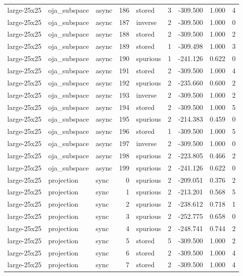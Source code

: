 \begin{tabular}{lllrlrrrr}
large-25x25 & oja\_subspace & async & 186 & stored & 3 & -309.500 & 1.000 & 4 \\
large-25x25 & oja\_subspace & async & 187 & inverse & 2 & -309.500 & 1.000 & 0 \\
large-25x25 & oja\_subspace & async & 188 & stored & 2 & -309.500 & 1.000 & 2 \\
large-25x25 & oja\_subspace & async & 189 & stored & 1 & -309.498 & 1.000 & 3 \\
large-25x25 & oja\_subspace & async & 190 & spurious & 1 & -241.126 & 0.622 & 0 \\
large-25x25 & oja\_subspace & async & 191 & stored & 2 & -309.500 & 1.000 & 4 \\
large-25x25 & oja\_subspace & async & 192 & spurious & 2 & -235.660 & 0.600 & 2 \\
large-25x25 & oja\_subspace & async & 193 & inverse & 2 & -309.500 & 1.000 & 2 \\
large-25x25 & oja\_subspace & async & 194 & stored & 2 & -309.500 & 1.000 & 5 \\
large-25x25 & oja\_subspace & async & 195 & spurious & 2 & -214.383 & 0.459 & 0 \\
large-25x25 & oja\_subspace & async & 196 & stored & 1 & -309.500 & 1.000 & 5 \\
large-25x25 & oja\_subspace & async & 197 & inverse & 2 & -309.500 & 1.000 & 0 \\
large-25x25 & oja\_subspace & async & 198 & spurious & 2 & -223.805 & 0.466 & 2 \\
large-25x25 & oja\_subspace & async & 199 & spurious & 2 & -241.126 & 0.622 & 0 \\
large-25x25 & projection & sync & 0 & spurious & 2 & -209.051 & 0.376 & 2 \\
large-25x25 & projection & sync & 1 & spurious & 2 & -213.201 & 0.568 & 5 \\
large-25x25 & projection & sync & 2 & spurious & 2 & -238.612 & 0.718 & 1 \\
large-25x25 & projection & sync & 3 & spurious & 2 & -252.775 & 0.658 & 0 \\
large-25x25 & projection & sync & 4 & spurious & 2 & -248.741 & 0.744 & 2 \\
large-25x25 & projection & sync & 5 & stored & 5 & -309.500 & 1.000 & 2 \\
large-25x25 & projection & sync & 6 & stored & 2 & -309.500 & 1.000 & 4 \\
large-25x25 & projection & sync & 7 & stored & 2 & -309.500 & 1.000 & 4 \\

\end{tabular}
